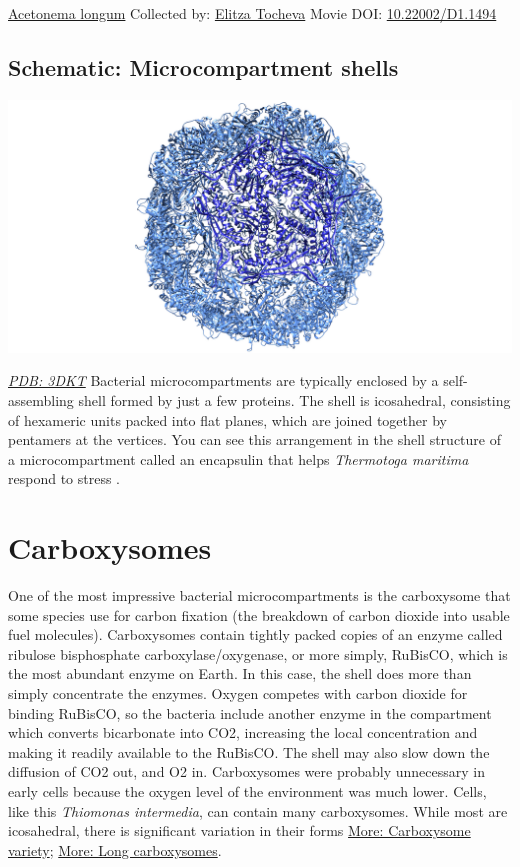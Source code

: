 \documentclass[]{tufte-book}
\begin{document}
\hypertarget{htmlwidget-16c05f91845c57bce92e}{}

\label{fig:4-6}\protect\hyperlink{tree}{Acetonema longum} Collected by: \protect\hyperlink{elitza_tocheva}{Elitza Tocheva} Movie DOI: \href{https://doi.org/10.22002/D1.1494}{10.22002/D1.1494}

\hypertarget{Microcompartment_shells}{%
\subsection*{Schematic: Microcompartment shells}\label{Microcompartment_shells}}

\includegraphics{img/schematics/4_6_1}

\href{http://rcsb.org/structure/3DKT}{\emph{PDB: 3DKT}}
Bacterial microcompartments are typically enclosed by a self-assembling shell formed by just a few proteins. The shell is icosahedral, consisting of hexameric units packed into flat planes, which are joined together by pentamers at the vertices. You can see this arrangement in the shell structure of a microcompartment called an encapsulin that helps \emph{Thermotoga maritima} respond to stress \citep{sutter2008}.

\hypertarget{carboxysomes}{%
\section{Carboxysomes}\label{carboxysomes}}

One of the most impressive bacterial microcompartments is the carboxysome that some species use for carbon fixation (the breakdown of carbon dioxide into usable fuel molecules). Carboxysomes contain tightly packed copies of an enzyme called ribulose bisphosphate carboxylase/oxygenase, or more simply, RuBisCO, which is the most abundant enzyme on Earth. In this case, the shell does more than simply concentrate the enzymes. Oxygen competes with carbon dioxide for binding RuBisCO, so the bacteria include another enzyme in the compartment which converts bicarbonate into CO2, increasing the local concentration and making it readily available to the RuBisCO. The shell may also slow down the diffusion of CO2 out, and O2 in. Carboxysomes were probably unnecessary in early cells because the oxygen level of the environment was much lower. Cells, like this \emph{Thiomonas intermedia}, can contain many carboxysomes. While most are icosahedral, there is significant variation in their forms \protect\hyperlink{Carboxysome_variety}{More: Carboxysome variety}; \protect\hyperlink{Long_carboxysomes}{More: Long carboxysomes}.
\end{document}
